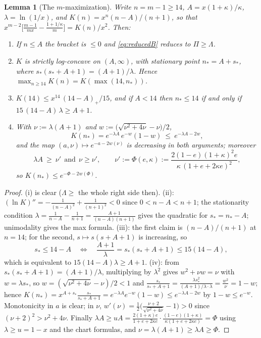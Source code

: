 \documentclass[11pt]{article}
\newtheorem{lemma}[theorem]{Lemma}
\begin{document}
\begin{lemma}[The $m$-maximization]\label{lem:Kmax}
Write $n=m-1\ge14$, $A=x(1+\kappa)/\kappa$, $\lambda=\ln(1/x)$, and
$K(n)=x^n(n-A)/(n+1)$, so that
$x^{m-2}\bigl[\frac{m-1}{mx}-\frac{1+1/\kappa}m\bigr]=K(n)/x^2$.  Then:
\begin{enumerate}[label=\textup{(\roman*)}]
\item If $n\le A$ the bracket is $\le0$ and \eqref{eq:reducedB} reduces to
$\Pi\ge\Lambda$.
\item $K$ is strictly log-concave on $(A,\infty)$, with stationary point
$n_*=A+s_*$, where $s_*(s_*+A+1)=(A+1)/\lambda$.  Hence
$\max_{n\ge14}K(n)=K(\max(14,n_*))$.
\item $K(14)\le x^{14}\,(14-A)_+/15$, and if $A<14$ then $n_*\le14$ if and
only if $15\,(14-A)\,\lambda\ge A+1$.
\item With $\nu:=\lambda(A+1)$ and $w:=\bigl(\sqrt{\nu^2+4\nu}-\nu\bigr)/2$,
\[
        K(n_*)=e^{-\lambda A}\,e^{-w}(1-w)\ \le\ e^{-\lambda A-2w},
\]
and the map $(a,\nu)\mapsto e^{-a-2w(\nu)}$ is decreasing in both arguments;
moreover
\[
        \lambda A\ \ge\ \nu'\ \ \text{and}\ \ \nu\ge\nu',
        \qquad
        \nu':=\Phi(e,\kappa):=\frac{2(1-e)(1+\kappa)^2e}{\kappa\,(1+e+2\kappa e)^2},
\]
so $K(n_*)\le e^{-\Phi-2w(\Phi)}$.
\end{enumerate}
\end{lemma}

\begin{proof}
(i) is clear ($\Lambda\ge$ the whole right side then).  (ii): $(\ln K)''=
-\frac1{(n-A)^2}+\frac1{(n+1)^2}<0$ since $0<n-A<n+1$; the stationarity
condition $\lambda=\frac1{n-A}-\frac1{n+1}=\frac{A+1}{(n-A)(n+1)}$ gives the
quadratic for $s_*=n_*-A$; unimodality gives the max formula.  (iii): the
first claim is $(n-A)/(n+1)$ at $n=14$; for the second,
$s\mapsto s(s+A+1)$ is increasing, so
\[
 s_*\le14-A
 \quad\Longleftrightarrow\quad
 \frac{A+1}{\lambda}=s_*(s_*+A+1)\le15(14-A),
\]
which is equivalent to $15(14-A)\lambda\ge A+1$.  (iv): from
$s_*(s_*+A+1)=(A+1)/\lambda$, multiplying by $\lambda^2$ gives
$w^2+\nu w=\nu$ with $w=\lambda s_*$, so $w=(\sqrt{\nu^2+4\nu}-\nu)/2<1$ and
$\frac{s_*}{s_*+A+1}=\frac{\lambda s_*^2}{(A+1)/\lambda\cdot\lambda}
=\frac{w^2}\nu=1-w$; hence
$K(n_*)=x^{A+s_*}\frac{s_*}{s_*+A+1}=e^{-\lambda A}e^{-w}(1-w)
\le e^{-\lambda A-2w}$ by $1-w\le e^{-w}$.  Monotonicity in $a$ is clear; in
$\nu$, $w'(\nu)=\frac12\bigl(\frac{\nu+2}{\sqrt{\nu^2+4\nu}}-1\bigr)>0$
since $(\nu+2)^2>\nu^2+4\nu$.  Finally
$\lambda A\ge uA=\frac{2(1+\kappa)e}{1+e+2\kappa e}\cdot
\frac{(1-e)(1+\kappa)}{\kappa(1+e+2\kappa e)}=\Phi$ using $\lambda\ge u=1-x$
and the chart formulas, and $\nu=\lambda(A+1)\ge\lambda A\ge\Phi$.
\end{proof}
\end{document}
